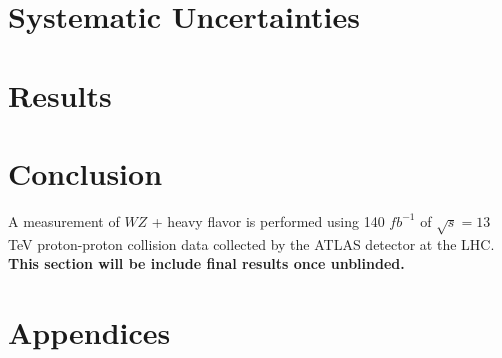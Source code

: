 \documentclass[NOTE, atlasdraft=true, texlive=2016, UKenglish]{\ATLASLATEXPATH atlasdoc}
\begin{document}
\section{Systematic Uncertainties}
\label{sec:sys}


\section{Results}
\label{sec:results}



\section{Conclusion}
\label{sec:conclusion}

A measurement of $WZ$ + heavy flavor is performed using 140 $fb^{-1}$ of $\sqrt{s} = 13$ TeV proton-proton collision data collected by the ATLAS detector at the LHC. \textbf{This section will be include final results once unblinded.}%

%
%



\clearpage
\appendix
\section*{Appendices}
\end{document}
